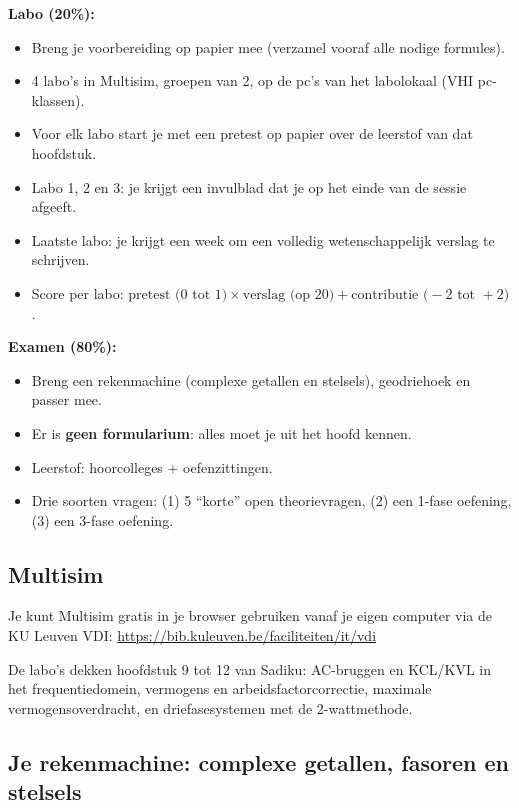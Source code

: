 \documentclass[a4paper,11pt]{article}
\begin{document}
\textbf{Labo (20\%):}
\begin{itemize}
    \item Breng je voorbereiding op papier mee (verzamel vooraf alle nodige formules).
    \item 4 labo's in Multisim, groepen van 2, op de pc's van het labolokaal (VHI pc-klassen).
    \item Voor elk labo start je met een pretest op papier over de leerstof van dat hoofdstuk.
    \item Labo 1, 2 en 3: je krijgt een invulblad dat je op het einde van de sessie afgeeft.
    \item Laatste labo: je krijgt een week om een volledig wetenschappelijk verslag te schrijven.
    \item Score per labo: $\text{pretest (0 tot 1)} \times \text{verslag (op 20)} + \text{contributie (}-2\text{ tot }+2\text{)}$.
\end{itemize}

\textbf{Examen (80\%):}
\begin{itemize}
    \item Breng een rekenmachine (complexe getallen en stelsels), geodriehoek en passer mee.
    \item Er is \textbf{geen formularium}: alles moet je uit het hoofd kennen.
    \item Leerstof: hoorcolleges + oefenzittingen.
    \item Drie soorten vragen: (1) 5 ``korte'' open theorievragen, (2) een 1-fase oefening,
          (3) een 3-fase oefening.
\end{itemize}

\subsection*{Multisim}

Je kunt Multisim gratis in je browser gebruiken vanaf je eigen computer via de KU Leuven VDI:
\url{https://bib.kuleuven.be/faciliteiten/it/vdi}


De labo's dekken hoofdstuk 9 tot 12 van Sadiku: AC-bruggen en KCL/KVL in het frequentiedomein,
vermogens en arbeidsfactorcorrectie, maximale vermogensoverdracht, en driefasesystemen met de
2-wattmethode.

\subsection*{Je rekenmachine: complexe getallen, fasoren en stelsels}\label{sec:rekenmachine}
\end{document}
